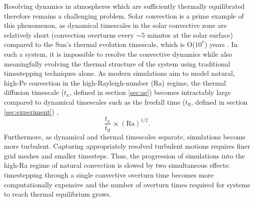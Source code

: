\documentclass[aps, pre, onecolumn, nofootinbib, notitlepage, groupedaddress, amsfonts, amssymb, amsmath, longbibliography]{revtex4-1}
\begin{document}
Resolving dynamics in atmospheres which are sufficiently
thermally equilibrated therefore remains a challenging problem.
Solar convection is a prime example of this phenomenon, as
dynamical timescales in the solar convective zone are relatively short 
(convection overturns every $\sim 5$ minutes at the solar surface)
compared to the Sun's thermal evolution timescale, which is O($10^7$) years
\cite{stix2003}.  
In such a system, it is impossible to resolve the convective dynamics while also
meaningfully evolving the thermal structure of the system using
traditional timestepping techniques alone.
As modern simulations aim to model natural, high-Pe convection
in the high-Rayleigh-number (Ra) regime,
the thermal diffusion timescale ($t_{\kappa}$, defined in section \ref{sec:ae}) 
becomes intractably large compared to dynamical timescales 
such as the freefall time ($t_{\text{ff}}$, defined in section \ref{sec:experiment})
\cite{anders&brown2017}, 
\begin{equation}
\frac{t_{\kappa}}{t_{\text{ff}}} \propto (\text{Ra})^{1/2}.
\end{equation}
Furthermore, as dynamical and thermal timescales separate, 
simulations become more turbulent. Capturing appropriately resolved
turbulent motions requires finer grid meshes and smaller timesteps.
Thus, the progression of simulations into the high-Ra
regime of natural convection is slowed by two simultaneous effects: timestepping
through a single convective overturn time becomes more computationally expensive
and the number of overturn times required for systems to reach thermal equilibrium
grows.
\end{document}
